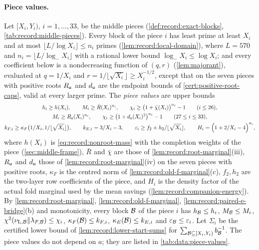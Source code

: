 \paragraph{Piece values.}
Let $[X_i,Y_i)$, $i=1,\dots,33$, be the middle pieces
(\cref{def:record:exact-blocks}, \cref{tab:record:middle-pieces}). Every block
of the piece $i$ has least prime at least $X_i$ and at most
$\lfloor L/\log X_i\rfloor\le n_i$ primes (\cref{lem:record:local-domain}), where
$L=570$ and $n_i=\lfloor L/\log_-X_i\rfloor$ with a rational lower bound
$\log_-X_i\le\log X_i$; and every coefficient below is a nondecreasing function
of $(q,r)$ (\cref{lem:majorant}), evaluated at $q=1/X_i$ and
$r=1/\lfloor\sqrt{X_i}\rfloor\ge X_i^{-1/2}$, except that on the seven pieces with
positive roots $R_\mathsf u$ and $d_\mathsf u$ are the endpoint bounds of
\cref{cert:positive-root-caps}, valid at every larger prime. The \emph{piece values}
are upper bounds
\begin{equation}\label{eq:variance:pieces}
\begin{gathered}
 h_i\ge h(X_i),\qquad M_i\ge\bar R(X_i)^{n_i},\qquad
 \chi_i\ge\bigl(1+\bar\chi(X_i)\bigr)^{n_i}-1\qquad(i\le26),\\
 M_i\ge R_\mathsf u(X_i)^{n_i},\qquad
 \chi_i\ge\bigl(1+d_\mathsf u(X_i)^2\bigr)^{n_i}-1\qquad(27\le i\le33),\\
 k_{F,i}\ge\kappa_F\bigl(1/X_i,1/\lfloor\sqrt{X_i}\rfloor\bigr),\qquad
 k_{E,i}=3/X_i-3,\qquad
 \varepsilon_i\ge f_2+h_2/\lfloor\sqrt{X_i}\rfloor,\qquad
 H_i=\Bigl(1+2/X_i-4\Bigr)^{n_i},
\end{gathered}
\end{equation}
where $h(X_i)$ is \eqref{eq:record:nonroot-mass} with the completion weights of
the piece (\cref{sec:middle-frame}), $\bar R$ and $\bar\chi$ are those of
\cref{lem:record:root-marginal}(iii), $R_\mathsf u$ and $d_\mathsf u$ those of
\cref{lem:record:root-marginal}(iv) on the seven pieces with positive roots,
$\kappa_F$ is the centred norm of \cref{lem:record:old-f-marginal}(c),
$f_2,h_2$ are the two-layer row coefficients of the piece, and $H_i$ is the
density factor of the actual fold marginal used by the mean savings
(\cref{lem:record:companion-energy}). By \cref{lem:record:root-marginal},
\cref{lem:record:old-f-marginal}, \cref{lem:record:paired-e-bridge}(b) and
monotonicity, every block $\mathcal B$ of the piece $i$ has $h_\mathcal B\le h_i$,
$M_\mathcal B\le M_i$, $\chi^2(\nu_{\mathrm L,\mathcal B}\|\lambda_{F,\mathcal B})\le\chi_i$,
$\kappa_F(\mathcal B)\le k_{F,i}$, $\kappa_E(\mathcal B)\le k_{E,i}$ and
$\varepsilon_\mathcal B\le\varepsilon_i$. Let $\Sigma_i$ be the certified lower bound of
\cref{lem:record:lower-start-sums} for $\sum_{\mathcal B\subseteq[X_i,Y_i)}b_\mathcal B^{-1}$.
The piece values do not depend on $a$; they are listed in
\cref{tab:data:piece-values}.

